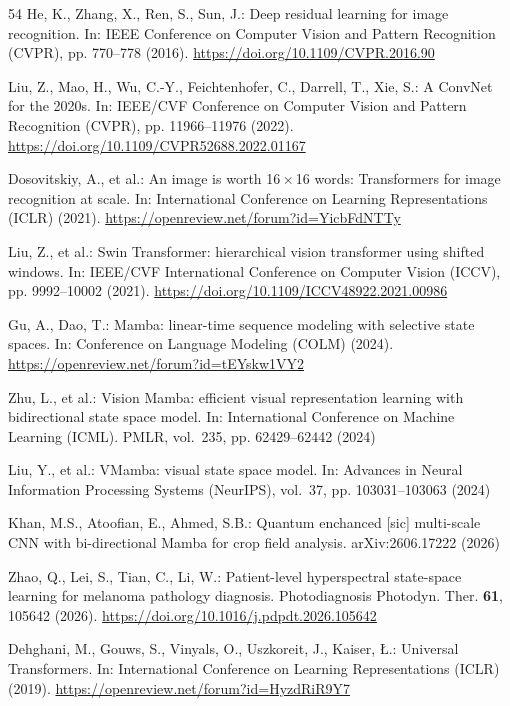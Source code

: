 \documentclass{svproc}
\begin{document}
\begin{thebibliography}{54}
He, K., Zhang, X., Ren, S., Sun, J.: Deep residual learning for image recognition. In: IEEE Conference on Computer Vision and Pattern Recognition (CVPR), pp. 770--778 (2016). \url{https://doi.org/10.1109/CVPR.2016.90}

Liu, Z., Mao, H., Wu, C.-Y., Feichtenhofer, C., Darrell, T., Xie, S.: A ConvNet for the 2020s. In: IEEE/CVF Conference on Computer Vision and Pattern Recognition (CVPR), pp. 11966--11976 (2022). \url{https://doi.org/10.1109/CVPR52688.2022.01167}

Dosovitskiy, A., et al.: An image is worth 16\,$\times$\,16 words: Transformers for image recognition at scale. In: International Conference on Learning Representations (ICLR) (2021). \url{https://openreview.net/forum?id=YicbFdNTTy}

Liu, Z., et al.: Swin Transformer: hierarchical vision transformer using shifted windows. In: IEEE/CVF International Conference on Computer Vision (ICCV), pp. 9992--10002 (2021). \url{https://doi.org/10.1109/ICCV48922.2021.00986}

Gu, A., Dao, T.: Mamba: linear-time sequence modeling with selective state spaces. In: Conference on Language Modeling (COLM) (2024). \url{https://openreview.net/forum?id=tEYskw1VY2}

Zhu, L., et al.: Vision Mamba: efficient visual representation learning with bidirectional state space model. In: International Conference on Machine Learning (ICML). PMLR, vol.~235, pp. 62429--62442 (2024)

Liu, Y., et al.: VMamba: visual state space model. In: Advances in Neural Information Processing Systems (NeurIPS), vol.~37, pp. 103031--103063 (2024)

Khan, M.S., Atoofian, E., Ahmed, S.B.: Quantum enchanced [sic] multi-scale CNN with bi-directional Mamba for crop field analysis. arXiv:2606.17222 (2026)

Zhao, Q., Lei, S., Tian, C., Li, W.: Patient-level hyperspectral state-space learning for melanoma pathology diagnosis. Photodiagnosis Photodyn. Ther. \textbf{61}, 105642 (2026). \url{https://doi.org/10.1016/j.pdpdt.2026.105642}

Dehghani, M., Gouws, S., Vinyals, O., Uszkoreit, J., Kaiser, \L.: Universal Transformers. In: International Conference on Learning Representations (ICLR) (2019). \url{https://openreview.net/forum?id=HyzdRiR9Y7}


\end{thebibliography}
\end{document}
